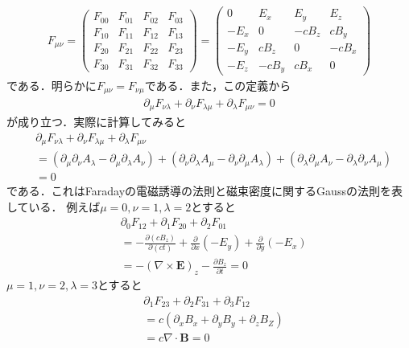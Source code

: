 \documentclass{report}
\begin{document}
  \begin{align}
    F_{\mu\nu}=
    \begin{pmatrix}
      F_{00} & F_{01} & F_{02} & F_{03}\\
      F_{10} & F_{11} & F_{12} & F_{13}\\
      F_{20} & F_{21} & F_{22} & F_{23}\\
      F_{30} & F_{31} & F_{32} & F_{33}
    \end{pmatrix}
    =
    \begin{pmatrix}
      0 & E_x & E_y & E_z \\
      -E_x & 0 & -cB_z & cB_y\\
      -E_y & cB_z & 0 & -cB_x\\
      -E_z& -cB_y & cB_x & 0
    \end{pmatrix}
  \end{align}
  である．明らかに$F_{\mu\nu} = F_{\nu\mu}$である．また，この定義から
  \begin{align}
    \partial_\mu F_{\nu\lambda} + \partial_\nu F_{\lambda\mu} + \partial_\lambda F_{\mu\nu} = 0
  \end{align}
  が成り立つ．実際に計算してみると
  \begin{align}
    &\partial_\mu F_{\nu\lambda} + \partial_\nu F_{\lambda\mu} + \partial_\lambda F_{\mu\nu} \\
    &= (\partial_\mu\partial_\nu A_\lambda - \partial_\mu\partial_\lambda A_\nu) + (\partial_\nu\partial_\lambda A_\mu - \partial_\nu\partial_\mu A_\lambda)
    + (\partial_\lambda\partial_\mu A_\nu - \partial_\lambda\partial_\nu A_\mu)\\
    &= 0
  \end{align}
  である．これはFaradayの電磁誘導の法則と磁束密度に関するGaussの法則を表している．
  例えば$\mu = 0,\nu = 1, \lambda =2$とすると
  \begin{align}
    &\partial_0 F_{12} + \partial_1 F_{20} + \partial_2 F_{01}\\
    &= -\frac{\partial (cB_z)}{\partial (ct)} + \frac{\partial}{\partial x}(-E_y) + \frac{\partial}{\partial y}(-E_x)\\
    &= -(\nabla\times \bm{E})_z - \frac{\partial B_z}{\partial t} = 0
  \end{align}
  $\mu=1,\nu=2,\lambda=3$とすると
  \begin{align}
    &\partial_1 F_{23} + \partial_2 F_{31} + \partial_3 F_{12}\\
    &= c(\partial_xB_x + \partial_yB_y + \partial_zB_Z)\\
    &= c\nabla\cdot\bm{B} = 0
  \end{align}
\end{document}

